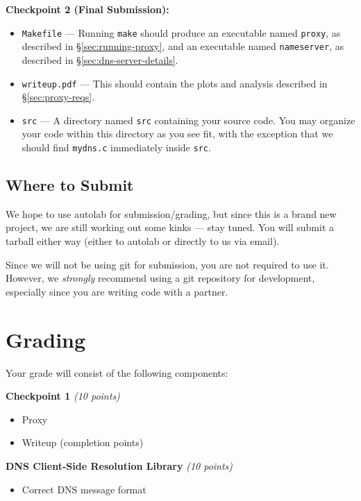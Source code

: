 \documentclass{article}
\begin{document}
\medskip \noindent \textbf{Checkpoint 2 (Final Submission):}
\begin{itemize}
	\item \texttt{Makefile} --- Running \texttt{make} should produce an
	executable named \texttt{proxy}, as described in \S\ref{sec:running-proxy},
	and an executable named \texttt{nameserver}, as described in
	\S\ref{sec:dns-server-details}.

	\item \texttt{writeup.pdf} --- This should contain the plots and analysis
	described in \S\ref{sec:proxy-reqs}. 

	\item \texttt{src} --- A directory named \texttt{src} containing your
	source code. You may organize your code within this directory as you see
	fit, with the exception that we should find \texttt{mydns.c} immediately
	inside \texttt{src}.
\end{itemize}


\subsection{Where to Submit}

We hope to use autolab for submission/grading, but since this is a brand new
project, we are still working out some kinks --- stay tuned. You will submit a
tarball either way (either to autolab or directly to us via email).

Since we will not be using git for submission, you are not required to use it.
However, we \emph{strongly} recommend using a git repository for development,
especially since you are writing code with a partner.


\section{Grading}

Your grade will consist of the following components:

\smallskip \noindent \textbf{Checkpoint 1} \textit{(10 points)}
\begin{itemize}
	\item Proxy
	\item Writeup (completion points)
\end{itemize}

\smallskip \noindent \textbf{DNS Client-Side Resolution Library} \textit{(10 points)}
\begin{itemize}
	\item Correct DNS message format
\end{itemize}
\end{document}
